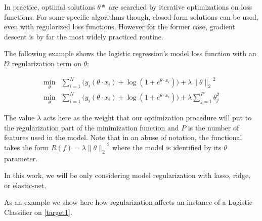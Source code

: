 In practice, optimal solutions $\theta*$ are searched by iterative optimizations on loss functions.
For some specific algorithms though, closed-form solutions can be used, even with regularized loss functions.
However for the former case, gradient descent is by far the most widely practiced routine.

The following example shows the logistic regression's model loss function with an $l2$ regularization term on $\theta$:

\begin{equation}\label{logitRegularization}
\begin{split}
\min_{\theta} & \sum_{i=1}^N \big(y_i ( \theta \cdot x_i ) + \log(1 + e^{\theta \cdot x_i} ) \big) + \lambda { \| \theta \|_{2}}^2 \\
\min_{\theta} & \sum_{i=1}^N \big(y_i ( \theta \cdot x_i ) + \log(1 + e^{\theta \cdot x_i} ) \big) + \lambda \sum_{j=1}^P \theta_j^2
\end{split}
\end{equation}


%


The value $\lambda$ acts here as the weight that our optimization procedure will put to the regularization part of the minimization function and $P$ is the number of features used in the model. Note that in an abuse of notation, the functional takes the form $R(f) = \lambda { \| \theta \|_{2}}^2$ where the model is identified by its $\theta$ parameter.

In this work, we will be only considering model regularization with lasso, ridge, or elastic-net.

As an example we show here how regularization affects an instance of a Logistic Classifier on  \cref{target1}.


